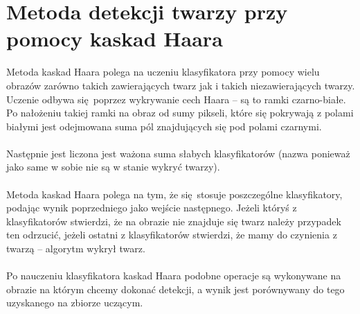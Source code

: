 \documentclass[a4paper, 12pt, titlepage]{article}
\begin{document}
    \section{Metoda detekcji twarzy przy pomocy kaskad Haara}
        Metoda kaskad Haara polega na uczeniu klasyfikatora przy pomocy wielu
        obrazów zarówno takich zawierających twarz jak i takich 
        niezawierających twarzy. Uczenie odbywa się poprzez wykrywanie cech 
        Haara -- są to ramki czarno-białe. Po nałożeniu takiej ramki na obraz 
        od sumy pikseli, które się pokrywają z polami białymi jest odejmowana
        suma pól znajdujących się pod polami czarnymi.
        \\ \\
        Następnie jest liczona jest ważona suma słabych klasyfikatorów (nazwa
        ponieważ jako same w sobie nie są w stanie wykryć twarzy).
        \\ \\
        Metoda kaskad Haara polega na tym, że się stosuje poszczególne
        klasyfikatory, podając wynik poprzedniego jako wejście następnego.
        Jeżeli któryś z klasyfikatorów stwierdzi, że na obrazie nie znajduje 
        się twarz należy przypadek ten odrzucić, jeżeli ostatni z
        klasyfikatorów stwierdzi, że mamy do czynienia z twarzą -- algorytm 
        wykrył twarz.
        \\ \\ 
        Po nauczeniu klasyfikatora kaskad Haara podobne operacje są wykonywane 
        na obrazie na którym chcemy dokonać detekcji, a wynik jest porównywany
        do tego uzyskanego na zbiorze uczącym.
\end{document}
